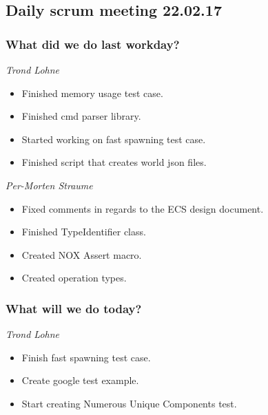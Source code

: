 \documentclass{article}
\begin{document}
\begin{center}
\subsection*{Daily scrum meeting 22.02.17}
\end{center}
\bigskip


\subsubsection*{What did we do last workday?}

\noindent\textit{Trond Lohne}
\begin{itemize}
	\item 
	Finished memory usage test case.
	
	\item 
	Finished cmd parser library.
	
	\item 
	Started working on fast spawning test case.

    \item
    Finished script that creates world json files.
\end{itemize}

\medskip

\noindent\textit{Per-Morten Straume}
\begin{itemize}
	\item 
    Fixed comments in regards to the ECS design document.
	
	\item 
	Finished TypeIdentifier class.
	
	\item 
	Created NOX Assert macro.

    \item
    Created operation types.
\end{itemize}


\subsubsection*{What will we do today?}

\noindent\textit{Trond Lohne}
\begin{itemize}
	\item 
	Finish fast spawning test case.
	
	\item 
	Create google test example.
	
	\item 
    Start creating Numerous Unique Components test.
\end{itemize}
\end{document}

